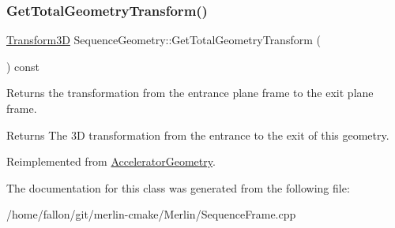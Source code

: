 \subsubsection{\texorpdfstring{Get\+Total\+Geometry\+Transform()}{GetTotalGeometryTransform()}}
{\footnotesize\ttfamily \hyperlink{classTransform3D}{Transform3D} Sequence\+Geometry\+::\+Get\+Total\+Geometry\+Transform (\begin{DoxyParamCaption}{ }\end{DoxyParamCaption}) const\hspace{0.3cm}{\ttfamily [virtual]}}

Returns the transformation from the entrance plane frame to the exit plane frame. \begin{DoxyReturn}{Returns}
The 3D transformation from the entrance to the exit of this geometry. 
\end{DoxyReturn}


Reimplemented from \hyperlink{classAcceleratorGeometry_a9bffb8262fc3b28195e1e25fbfb2b8ba}{Accelerator\+Geometry}.



The documentation for this class was generated from the following file\+:\begin{DoxyCompactItemize}
\item 
/home/fallon/git/merlin-\/cmake/\+Merlin/Sequence\+Frame.\+cpp\end{DoxyCompactItemize}
